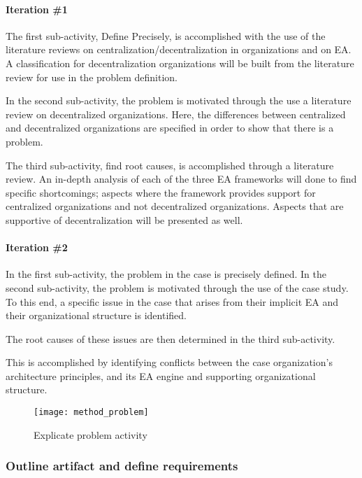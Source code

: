\paragraph{Iteration \#1}

The first sub-activity, Define Precisely, is accomplished with the use of the literature reviews on centralization/decentralization in  organizations and on EA. A classification for decentralization organizations will be built from the literature review for use in the problem definition. 

In the second sub-activity, the problem is motivated through the use a literature review on decentralized organizations. Here, the differences between centralized and decentralized  organizations are specified in order to show that there is a problem. 

The third sub-activity, find root causes, is accomplished through a literature review. An in-depth analysis of each of the three EA frameworks will done to find specific shortcomings; aspects where the framework provides support for centralized organizations and not decentralized organizations. Aspects that are supportive of decentralization will be presented as well.

\paragraph{Iteration \#2}

In the first sub-activity, the problem in the case is precisely defined. In the second sub-activity, the problem is motivated through the use of the case study. To this end, a specific issue in the case that arises from their implicit EA and their organizational structure is identified.

The root causes of these issues are then determined in the third sub-activity. 

This is accomplished by identifying conflicts between the case organization's architecture principles, and its EA engine and supporting organizational structure.

\begin{figure}
\texttt{[image: method\_problem]}
\caption{Explicate problem activity}
\label{fig:method_problem}
\end{figure}

\subsubsection*{Outline artifact and define requirements}

